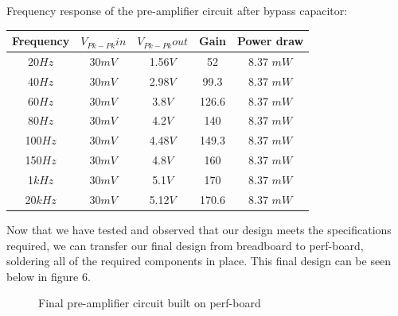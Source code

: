 \documentclass[a4paper,11pt]{article}
\begin{document}
Frequency response of the pre-amplifier circuit after bypass capacitor:\\
\begin{tabular}{|c|c|c|c|c|}  
\hline
Frequency &  \(\displaystyle V_{Pk-Pk}in \)  & \(\displaystyle V_{Pk-Pk} out\) & Gain & Power draw\\
\hline
20\(\displaystyle Hz \) & 30\(\displaystyle mV\)     &  1.56\(\displaystyle V\)  & 52    & 8.37 \(\displaystyle mW\)\\
40\(\displaystyle Hz \) &  30\(\displaystyle mV\)     &  2.98\(\displaystyle V\)    & 99.3  & 8.37 \(\displaystyle mW\)\\
60\(\displaystyle Hz \) &  30\(\displaystyle mV\)    & 3.8\(\displaystyle V\)     & 126.6    & 8.37 \(\displaystyle mW\)  \\
80\(\displaystyle Hz \)&  30\(\displaystyle mV\)       &  4.2\(\displaystyle V\)    & 140    & 8.37 \(\displaystyle mW\)\\
100\(\displaystyle Hz \)&  30\(\displaystyle mV\)    &  4.48\(\displaystyle V\)     & 149.3    & 8.37 \(\displaystyle mW\) \\
150\(\displaystyle Hz \)&  30\(\displaystyle mV\)    &  4.8\(\displaystyle V\)     & 160    & 8.37 \(\displaystyle mW\) \\
1\(\displaystyle k Hz \)&  30\(\displaystyle mV\)     &  5.1\(\displaystyle V\)     & 170   & 8.37 \(\displaystyle mW\)\\
20\(\displaystyle k Hz \)& 30\(\displaystyle mV\)     &  5.12\(\displaystyle V\)    & 170.6    & 8.37 \(\displaystyle mW\) \\
\hline
\end{tabular}

\pagebreak

Now that we have tested and observed that our design meets the specifications required, we can transfer our final design from breadboard to perf-board, soldering all of the required components in place. This final design can be seen below in figure 6. 

\begin{figure}[h]
 \begin{center}
  \caption{Final pre-amplifier circuit built on perf-board}
 \end{center}
\end{figure}
\end{document}
